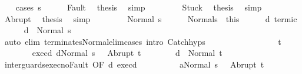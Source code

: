 \begin{isabellebody}
\ \ \isamarkupfalse%
\ {\isacharparenleft}cases\ s{\isacharparenright}\isanewline
\ \ \ \ \isamarkupfalse%
\ Fault\ \isamarkupfalse%
\ {\isacharquery}thesis\ \isamarkupfalse%
\ simp\isanewline
\ \ \isamarkupfalse%
\isanewline
\ \ \ \ \isamarkupfalse%
\ Stuck\ \isamarkupfalse%
\ {\isacharquery}thesis\ \isamarkupfalse%
\ simp\isanewline
\ \ \isamarkupfalse%
\isanewline
\ \ \ \ \isamarkupfalse%
\ Abrupt\ \isamarkupfalse%
\ {\isacharquery}thesis\ \isamarkupfalse%
\ simp\isanewline
\ \ \isamarkupfalse%
\isanewline
\ \ \ \ \isamarkupfalse%
\ {\isacharparenleft}Normal\ s{\isacharprime}{\isacharparenright}\isanewline
\ \ \ \ \isamarkupfalse%
\ Normal{\isacharunderscore}s\ {\isacharequal}\ this\isanewline
\ \ \ \ \isamarkupfalse%
\ d{}\ termi{\isacharunderscore}c{}\isanewline
\ \ \ \ \isamarkupfalse%
\ {\isachardoublequoteopen}{\isasymGamma}{\isasymturnstile}d{}\ {\isasymdown}\ Normal\ s{\isacharprime}{\isachardoublequoteclose}\isanewline
\ \ \ \ \ \ \isamarkupfalse%
\ {\isacharparenleft}auto\ elim{\isacharcolon}\ terminates{\isacharunderscore}Normal{\isacharunderscore}elim{\isacharunderscore}cases\ intro{\isacharcolon}\ Catch{\isachardot}hyps{\isacharparenright}\isanewline
\ \ \ \ \isamarkupfalse%
\isanewline
\ \ \ \ \isacommand{{\isacharbraceleft}}\isamarkupfalse%
\isanewline
\ \ \ \ \ \ \isamarkupfalse%
\ t\isanewline
\ \ \ \ \ \ \isamarkupfalse%
\ exec{\isacharunderscore}d{}{\isacharcolon}\ {\isachardoublequoteopen}{\isasymGamma}{\isasymturnstile}{\isasymlangle}d{}{\isacharcomma}Normal\ s{\isacharprime}\ {\isasymrangle}\ {\isasymRightarrow}\ Abrupt\ t{\isachardoublequoteclose}\isanewline
\ \ \ \ \ \ \isamarkupfalse%
\ {\isachardoublequoteopen}{\isasymGamma}{\isasymturnstile}d{}\ {\isasymdown}\ Normal\ t{\isachardoublequoteclose}\isanewline
\ \ \ \ \ \ \isamarkupfalse%
\ {\isacharminus}\isanewline
\ \ \ \ \ \ \ \ \isamarkupfalse%
\ inter{\isacharunderscore}guards{\isacharunderscore}exec{\isacharunderscore}noFault\ {\isacharbrackleft}OF\ d{}\ exec{\isacharunderscore}d{}{\isacharbrackright}\isanewline
\ \ \ \ \ \ \ \ \isamarkupfalse%
\ {\isachardoublequoteopen}{\isasymGamma}{\isasymturnstile}{\isasymlangle}a{}{\isacharcomma}Normal\ s{\isacharprime}\ {\isasymrangle}\ {\isasymRightarrow}\ Abrupt\ t{\isachardoublequoteclose}\isanewline

\end{isabellebody}
